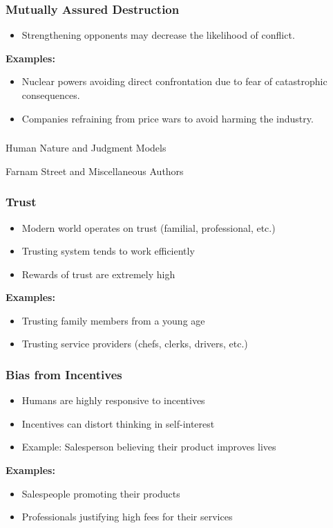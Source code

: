 \begin{frame}[fragile]\frametitle{Mutually Assured Destruction}
\begin{itemize}
    \item Strengthening opponents may decrease the likelihood of conflict.
\end{itemize}
\textbf{Examples:}
\begin{itemize}
    \item Nuclear powers avoiding direct confrontation due to fear of catastrophic consequences.
    \item Companies refraining from price wars to avoid harming the industry.
\end{itemize}
\end{frame}

\begin{frame}[fragile]\frametitle{}
\begin{center}
{\Large Human Nature and Judgment Models}

{\tiny Farnam Street and Miscellaneous Authors }


\end{center}
\end{frame}

\begin{frame}[fragile]\frametitle{Trust}
\begin{itemize}
    \item Modern world operates on trust (familial, professional, etc.)
    \item Trusting system tends to work efficiently
    \item Rewards of trust are extremely high
\end{itemize}
\textbf{Examples:}
\begin{itemize}
    \item Trusting family members from a young age
    \item Trusting service providers (chefs, clerks, drivers, etc.)
\end{itemize}
\end{frame}

\begin{frame}[fragile]\frametitle{Bias from Incentives}
\begin{itemize}
    \item Humans are highly responsive to incentives
    \item Incentives can distort thinking in self-interest
    \item Example: Salesperson believing their product improves lives
\end{itemize}
\textbf{Examples:}
\begin{itemize}
    \item Salespeople promoting their products
    \item Professionals justifying high fees for their services
\end{itemize}
\end{frame}

